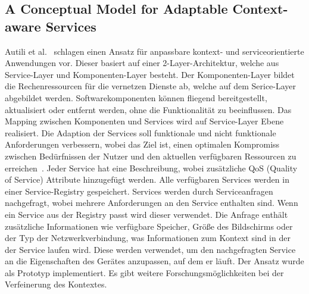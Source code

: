 \documentclass[conference,compsoc]{IEEEtran}
\begin{document}
\subsection{A Conceptual Model for Adaptable Context-aware Services}
Autili et al.~\cite{autili2006conceptual} schlagen einen Ansatz für anpassbare kontext- und serviceorientierte Anwendungen vor. Dieser basiert auf einer 2-Layer-Architektur, welche aus Service-Layer und Komponenten-Layer besteht. Der Komponenten-Layer bildet die Rechenressourcen für die vernetzen Dienste ab, welche auf dem Serice-Layer abgebildet werden. Softwarekomponenten können fliegend bereitgestellt, aktualisiert oder entfernt werden, ohne die Funktionalität zu beeinflussen. Das Mapping zwischen Komponenten und Services wird auf Service-Layer Ebene realisiert.
Die Adaption der Services soll funktionale und nicht funktionale Anforderungen verbessern, wobei das Ziel ist, einen optimalen Kompromiss zwischen Bedürfnissen der Nutzer und den aktuellen verfügbaren Ressourcen zu erreichen~\cite{autili2006conceptual}. Jeder Service hat eine Beschreibung, wobei zusätzliche QoS (Quality of Service) Attribute hinzugefügt werden. Alle verfügbaren Services werden in einer Service-Registry gespeichert. Services werden durch Serviceanfragen nachgefragt, wobei mehrere Anforderungen an den Service enthalten sind. Wenn ein Service aus der Registry passt wird dieser verwendet. Die Anfrage enthält zusätzliche Informationen wie verfügbare Speicher, Größe des Bildschirms oder der Typ der Netzwerkverbindung, was Informationen zum Kontext sind in der der Service laufen wird. Diese werden verwendet, um den nachgefragten Service an die Eigenschaften des Gerätes anzupassen, auf dem er läuft.
Der Ansatz wurde als Prototyp implementiert. Es gibt weitere Forschungsmöglichkeiten bei der Verfeinerung des Kontextes.
\end{document}
